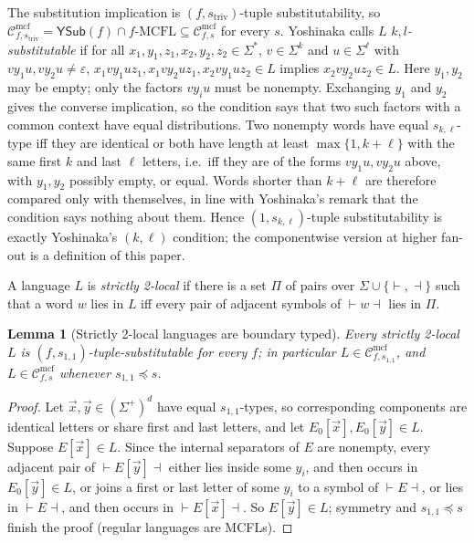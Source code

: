 \documentclass[11pt]{article}
\numberwithin{equation}{section}
\theoremstyle{plain}
\newtheorem{lemma}[theorem]{Lemma}
\theoremstyle{definition}
\theoremstyle{remark}
\newcommand{\Cmcf}[2]{\mathcal{C}^{\mathrm{mcf}}_{#1,#2}}
\newcommand{\tuple}[1]{\vec{#1}}
\newcommand{\eps}{\varepsilon}
\newcommand{\YSub}[1]{\mathsf{YSub}(#1)}
\theoremstyle{plain}
\begin{document}
The substitution implication is $(f,s_{\mathrm{triv}})$-tuple substitutability,
so $\Cmcf{f}{s_{\mathrm{triv}}}=\YSub{f}\cap f\text{-}\mathrm{MCFL}\subseteq\Cmcf{f}{s}$
for every $s$.  Yoshinaka \cite[Definition~2]{Yoshinaka2008} calls $L$
\emph{$k,l$-substitutable} if for all $x_1,y_1,z_1,x_2,y_2,z_2\in\Sigma^*$,
$v\in\Sigma^k$ and $u\in\Sigma^\ell$ with $vy_1u,vy_2u\ne\eps$,
$x_1vy_1uz_1,x_1vy_2uz_1,x_2vy_1uz_2\in L$ implies $x_2vy_2uz_2\in L$.  Here
$y_1,y_2$ may be empty; only the factors $vy_iu$ must be nonempty.  Exchanging
$y_1$ and $y_2$ gives the converse implication, so the condition says that two
such factors with a common context have equal distributions.  Two nonempty words
have equal $s_{k,\ell}$-type iff they are identical or both have length at least
$\max\{1,k+\ell\}$ with the same first $k$ and last $\ell$ letters, i.e.\ iff they
are of the forms $vy_1u,vy_2u$ above, with $y_1,y_2$ possibly empty, or equal.
Words shorter than $k+\ell$ are therefore compared only with themselves, in line
with Yoshinaka's remark that the condition says nothing about them.  Hence
$(1,s_{k,\ell})$-tuple substitutability is exactly Yoshinaka's $(k,\ell)$
condition; the componentwise version at higher fan-out is a definition of this
paper.

A language $L$ is \emph{strictly 2-local} if there is a set $\Pi$ of pairs over
$\Sigma\cup\{\vdash,\dashv\}$ such that a word $w$ lies in $L$ iff every pair of
adjacent symbols of $\vdash w\dashv$ lies in $\Pi$.

\begin{lemma}[Strictly 2-local languages are boundary typed]
\label{lem:sl2-boundary-control-foc}
Every strictly 2-local $L$ is $(f,s_{1,1})$-tuple-substitutable for every $f$; in
particular $L\in\Cmcf{f}{s_{1,1}}$, and $L\in\Cmcf{f}{s}$ whenever $s_{1,1}\preceq s$.
\end{lemma}

\begin{proof}
Let $\tuple x,\tuple y\in(\Sigma^+)^d$ have equal $s_{1,1}$-types, so
corresponding components are identical letters or share first and last letters,
and let $E_0[\tuple x],E_0[\tuple y]\in L$.  Suppose $E[\tuple x]\in L$.  Since the
internal separators of $E$ are nonempty, every adjacent pair of
$\vdash E[\tuple y]\dashv$ either lies inside some $y_i$, and then occurs in
$E_0[\tuple y]\in L$, or joins a first or last letter of some $y_i$ to a symbol of
$\vdash E\dashv$, or lies in $\vdash E\dashv$, and then occurs in
$\vdash E[\tuple x]\dashv$.  So $E[\tuple y]\in L$; symmetry and $s_{1,1}\preceq s$
finish the proof (regular languages are MCFLs).
\end{proof}
\end{document}
